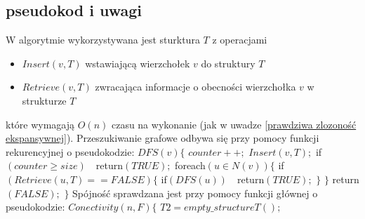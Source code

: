 \documentclass{pracamgr}
\begin{document}
   \subsection{pseudokod i uwagi}
    W algorytmie wykorzystywana jest sturktura $T$ z operacjami
    \begin{itemize}
     \item $Insert(v,T)$ wstawiającą wierzchołek $v$ do struktury $T$
     \item $Retrieve(v,T)$ zwracająca informacje o obecności wierzchołka $v$ w strukturze $T$
    \end{itemize}
    które wymagają $O(n)$ czasu na wykonanie (jak w uwadze \ref{prawdziwa zlozoność ekspansywnej}).\newline
    Przeszukiwanie grafowe odbywa się przy pomocy funkcji rekurencyjnej o pseudokodzie:\newline
    \hspace*{0pt}$DFS(v)\{$\newline
    \hspace*{16pt}	$counter++;$\newline
    \hspace*{16pt}	$Insert(v,T);$\newline
    \hspace*{16pt}	if$(counter\ge size)\quad $return$(TRUE);$\newline
    \hspace*{16pt}	foreach$(u\in N(v))\{$\newline
    \hspace*{32pt}		if$(Retrieve(u,T)==FALSE)\{$\newline
    \hspace*{48pt}			if$(DFS(u))\quad $return$(TRUE);$\newline
    \hspace*{32pt}		$\}$\newline
    \hspace*{16pt}	$\}$\newline
    \hspace*{16pt}	return$(FALSE);$\newline
    \hspace*{0pt}$\}$\newline  
    Spójność sprawdzana jest przy pomocy funkcji głównej o pseudokodzie:\newline\newline
    \hspace*{0pt}$Conectivity(n,F)\{$\newline
    \hspace*{16pt}	$T2=empty\_structureT();$\newline
\end{document}
